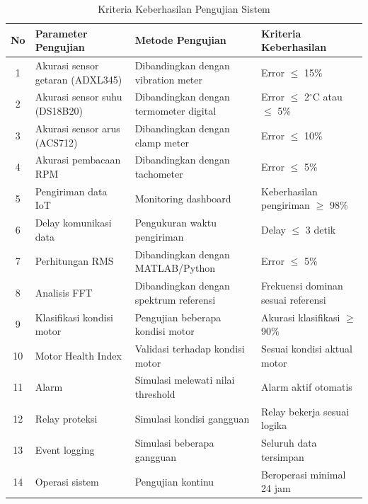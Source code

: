 \documentclass{elsinta}
\begin{document}
\begin{table}[H]
\centering
\caption{Kriteria Keberhasilan Pengujian Sistem}
\label{tab:kriteria_pengujian}
\renewcommand{\arraystretch}{1.3}

\begin{tabular}{|c|p{4.5cm}|p{4.2cm}|p{4cm}|}
\hline
\textbf{No} &
\centering\textbf{Parameter Pengujian} &
\centering\textbf{Metode Pengujian} &
\centering\arraybackslash\textbf{Kriteria Keberhasilan}\\
\hline

1 &
Akurasi sensor getaran (ADXL345) &
Dibandingkan dengan vibration meter &
Error $\leq$ 15\%\\
\hline

2 &
Akurasi sensor suhu (DS18B20) &
Dibandingkan dengan termometer digital &
Error $\leq$ 2$^\circ$C atau $\leq$ 5\%\\
\hline

3 &
Akurasi sensor arus (ACS712) &
Dibandingkan dengan clamp meter &
Error $\leq$ 10\%\\
\hline

4 &
Akurasi pembacaan RPM &
Dibandingkan dengan tachometer &
Error $\leq$ 5\%\\
\hline

5 &
Pengiriman data IoT &
Monitoring dashboard &
Keberhasilan pengiriman $\geq$ 98\%\\
\hline

6 &
Delay komunikasi data &
Pengukuran waktu pengiriman &
Delay $\leq$ 3 detik\\
\hline

7 &
Perhitungan RMS &
Dibandingkan dengan MATLAB/Python &
Error $\leq$ 5\%\\
\hline

8 &
Analisis FFT &
Dibandingkan dengan spektrum referensi &
Frekuensi dominan sesuai referensi\\
\hline

9 &
Klasifikasi kondisi motor &
Pengujian beberapa kondisi motor &
Akurasi klasifikasi $\geq$ 90\%\\
\hline

10 &
Motor Health Index &
Validasi terhadap kondisi motor &
Sesuai kondisi aktual motor\\
\hline

11 &
Alarm &
Simulasi melewati nilai threshold &
Alarm aktif otomatis\\
\hline

12 &
Relay proteksi &
Simulasi kondisi gangguan &
Relay bekerja sesuai logika\\
\hline

13 &
Event logging &
Simulasi beberapa gangguan &
Seluruh data tersimpan\\
\hline

14 &
Operasi sistem &
Pengujian kontinu &
Beroperasi minimal 24 jam\\
\hline

\end{tabular}
\end{table}
\end{document}
